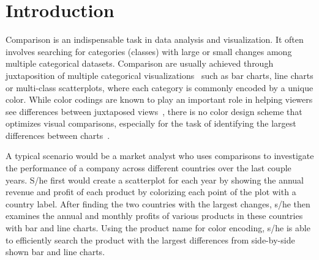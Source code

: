 \section{Introduction}
Comparison is an indispensable task in data analysis and visualization. It often involves searching for categories (classes) with large or small changes among multiple categorical datasets.
Comparison are usually achieved through juxtaposition of multiple categorical visualizations~\cite{Gleicher18,LYi21} such as bar charts, line charts or multi-class scatterplots, where each category is commonly encoded by a unique color.
While color codings are known to play an important role in helping viewers see differences between juxtaposed views~\cite{Tominski08,Albers11,Gleicher18}, there is no color design scheme that optimizes visual comparisons, especially for the task of identifying the largest differences between charts~\cite{Ondov19}. %

A typical scenario would be  a market analyst who uses comparisons to
investigate the performance of a company across different countries over the last couple years.
S/he first would create a scatterplot for each year by showing the annual revenue and profit of each product by colorizing each point of the plot with a country label.
After finding the two countries with the largest changes, s/he then examines the annual and monthly profits of various products in these countries with bar and line charts. Using the product name for color encoding, s/he is able to  efficiently search the product with the largest differences from side-by-side shown bar and line charts.



